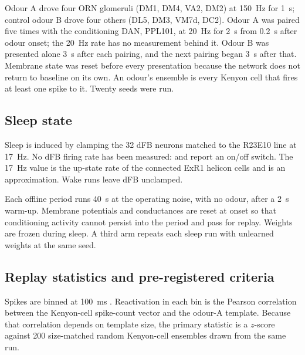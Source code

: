 \documentclass[11pt]{article}
\begin{document}
Odour A drove four ORN glomeruli (DM1, DM4, VA2, DM2) at 150~Hz for 1~s; control odour B drove four others (DL5, DM3, VM7d, DC2). Odour A was paired five times with the conditioning DAN, PPL101, at 20~Hz for 2~s from 0.2~s after odour onset; the 20~Hz rate has no measurement behind it. Odour B was presented alone 3~s after each pairing, and the next pairing began 3~s after that. Membrane state was reset before every presentation because the network does not return to baseline on its own. An odour's ensemble is every Kenyon cell that fires at least one spike to it. Twenty seeds were run.

\subsection{Sleep state}
Sleep is induced by clamping the 32 dFB neurons matched to the R23E10 line \citep{hulse2021} at 17~Hz. No dFB firing rate has been measured: \citet{donlea2014} and \citet{pimentel2016} report an on/off switch. The 17~Hz value is the up-state rate of the connected ExR1 helicon cells \citep{donlea2018} and is an approximation. Wake runs leave dFB unclamped.

Each offline period runs 40~s at the operating noise, with no odour, after a 2~s warm-up. Membrane potentials and conductances are reset at onset so that conditioning activity cannot persist into the period and pass for replay. Weights are frozen during sleep. A third arm repeats each sleep run with unlearned weights at the same seed.

\subsection{Replay statistics and pre-registered criteria}
Spikes are binned at 100~ms \citep{kudrimoti1999}. Reactivation in each bin is the Pearson correlation between the Kenyon-cell spike-count vector and the odour-A template. Because that correlation depends on template size, the primary statistic is a $z$-score against 200 size-matched random Kenyon-cell ensembles drawn from the same run.
\end{document}
